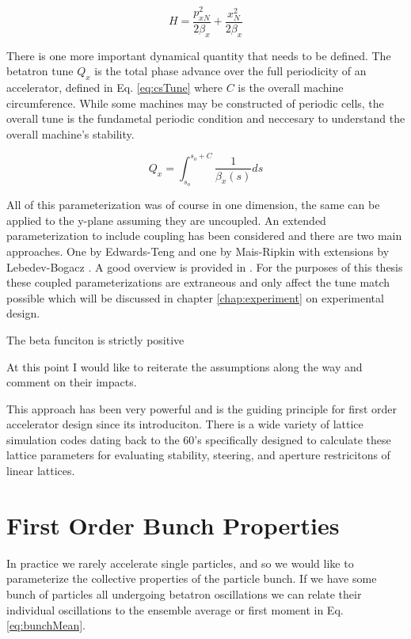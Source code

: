 \begin{equation} \label{eq:csNormHam}
	H = \frac{p_{xN}^2}{2\beta_x} + \frac{x_{N}^2}{2\beta_x}
\end{equation}

There is one more important dynamical quantity that needs to be defined. The betatron tune $Q_x$ is the total phase advance over the full periodicity of an accelerator, defined in Eq. \ref{eq:csTune} where $C$ is the overall machine circumference. While some machines may be constructed of periodic cells, the overall tune is the fundametal periodic condition and neccesary to understand the overall machine's stability.

\begin{equation} \label{eq:csTune}
	Q_x = \int_{s_o}^{s_o + C} \frac{1}{\beta_x(s)} ds
\end{equation}

All of this parameterization was of course in one dimension, the same can be applied to the y-plane assuming they are uncoupled. An extended parameterization to include coupling has been considered and there are two main approaches. One by Edwards-Teng \cite{edwards-teng} and one by Mais-Ripkin \cite{mais-ripkin} with extensions by Lebedev-Bogacz \cite{lebedev-bogacz}. A good overview is provided in \cite{vanwelde}. For the purposes of this thesis these coupled parameterizations are extraneous and only affect the tune match possible which will be discussed in chapter \ref{chap:experiment} on experimental design.

The beta funciton is strictly positive

At this point I would like to reiterate the assumptions along the way and comment on their impacts.

This approach has been very powerful and is the guiding principle for first order accelerator design since its introduciton. There is a wide variety of lattice simulation codes dating back to the 60's specifically designed to calculate these lattice parameters for evaluating stability, steering, and aperture restricitons of linear lattices.

\section{First Order Bunch Properties} \label{sec:bunchEmit}
In practice we rarely accelerate single particles, and so we would like to parameterize the collective properties of the particle bunch. If we have some bunch of particles all undergoing betatron oscillations we can relate their individual oscillations to the ensemble average or first moment in Eq. \ref{eq:bunchMean}.

